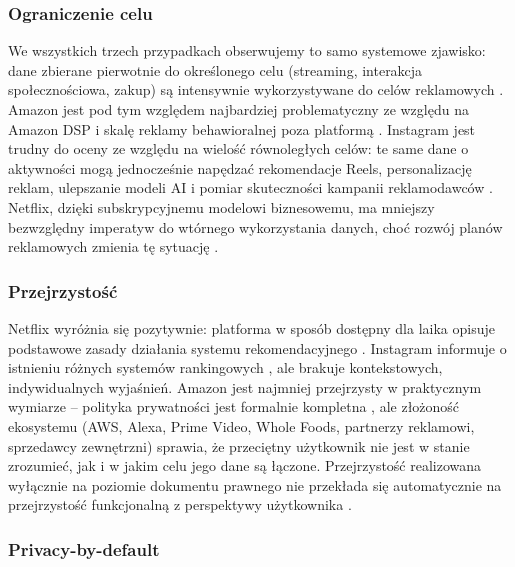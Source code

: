 \documentclass[12pt, a4paper]{article}
\begin{document}
\subsubsection{Ograniczenie celu}

We wszystkich trzech przypadkach obserwujemy to samo systemowe zjawisko: dane zbierane pierwotnie do określonego celu (streaming, interakcja społecznościowa, zakup) są intensywnie wykorzystywane do celów reklamowych \cite{rodo, chen2025}. Amazon jest pod tym względem najbardziej problematyczny ze względu na Amazon DSP i skalę reklamy behawioralnej poza platformą \cite{amazon_dsp}. Instagram jest trudny do oceny ze względu na wielość równoległych celów: te same dane o aktywności mogą jednocześnie napędzać rekomendacje Reels, personalizację reklam, ulepszanie modeli AI i pomiar skuteczności kampanii reklamodawców \cite{meta_privacy, meta_ai}. Netflix, dzięki subskrypcyjnemu modelowi biznesowemu, ma mniejszy bezwzględny imperatyw do wtórnego wykorzystania danych, choć rozwój planów reklamowych zmienia tę sytuację \cite{netflix_privacy}.

\subsubsection{Przejrzystość}

Netflix wyróżnia się pozytywnie: platforma w sposób dostępny dla laika opisuje podstawowe zasady działania systemu rekomendacyjnego \cite{netflix_recs, netflix_research}. Instagram informuje o istnieniu różnych systemów rankingowych \cite{ig_ranking, ig_creators}, ale brakuje kontekstowych, indywidualnych wyjaśnień. Amazon jest najmniej przejrzysty w praktycznym wymiarze -- polityka prywatności jest formalnie kompletna \cite{amazon_privacy}, ale złożoność ekosystemu (AWS, Alexa, Prime Video, Whole Foods, partnerzy reklamowi, sprzedawcy zewnętrzni) sprawia, że przeciętny użytkownik nie jest w stanie zrozumieć, jak i w jakim celu jego dane są łączone. Przejrzystość realizowana wyłącznie na poziomie dokumentu prawnego nie przekłada się automatycznie na przejrzystość funkcjonalną z perspektywy użytkownika \cite{chen2025}.

\subsubsection{Privacy-by-default}
\end{document}
